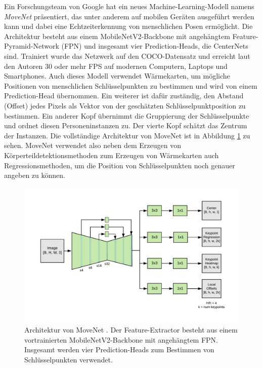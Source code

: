 Ein Forschungsteam von Google hat ein neues Machine-Learning-Modell namens
\textit{MoveNet} \cite{movenet} präsentiert, das unter anderem auf mobilen
Geräten ausgeführt werden kann und dabei eine Echtzeiterkennung von menschlichen
Posen ermöglicht. Die Architektur besteht aus einem MobileNetV2-Backbone mit
angehängtem Feature-Pyramid-Network (FPN) und insgesamt vier Prediction-Heads,
die CenterNets \cite{zhou2019objects} sind. Trainiert wurde das Netzwerk
auf den COCO-Datensatz und erreicht laut den Autoren 30 oder mehr FPS auf
modernen Computern, Laptops und Smartphones. Auch dieses Modell verwendet
Wärmekarten, um mögliche Positionen von menschlichen Schlüsselpunkten zu
bestimmen und wird von einem Prediction-Head übernommen. Ein weiterer ist dafür
zuständig, den Abstand (Offset) jedes Pixels als Vektor von der geschätzten
Schlüsselpunktposition zu bestimmen. Ein anderer Kopf übernimmt die Gruppierung
der Schlüsselpunkte und ordnet diesen Personeninstanzen zu. Der vierte Kopf
schätzt das Zentrum der Instanzen. Die vollständige Architektur von MoveNet ist
in Abbildung \ref{fig:movenet-architecture} zu sehen. MoveNet verwendet also
neben dem Erzeugen von Körperteildetektionsmethoden zum Erzeugen von Wärmekarten
auch Regressionsmethoden, um die Position von Schlüsselpunkten noch genauer
angeben zu können.

\begin{figure}
    \includegraphics[width=\textwidth]{images/movenet_architecture.png}
    \caption{Architektur von MoveNet \cite{movenet}. Der Feature-Extractor
    besteht aus einem vortrainierten MobileNetV2-Backbone mit angehängtem FPN.
    Insgesamt werden vier Prediction-Heads zum Bestimmen von Schlüsselpunkten
    verwendet.}
    \label{fig:movenet-architecture}
\end{figure}

